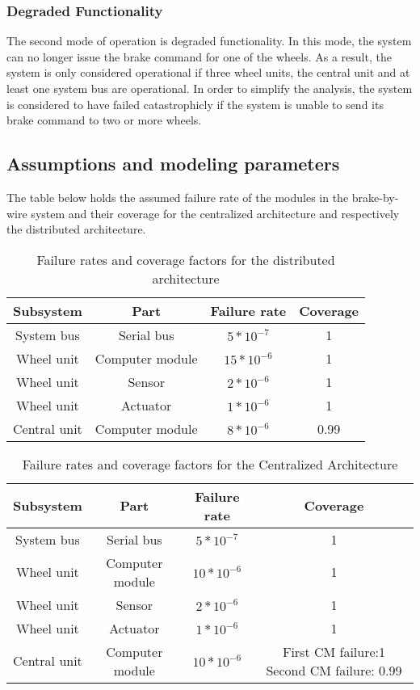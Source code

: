 \subsubsection{Degraded Functionality}
The second mode of operation is degraded functionality. In this mode, the system can no longer issue the brake command for one of the wheels. As a result, the system is only considered operational if three wheel units, the central unit and at least one system bus are operational. In order to simplify the analysis, the system is considered to have failed catastrophicly
if the system is unable to send its brake command to two or more wheels.
\subsection{Assumptions and modeling parameters}
The table below holds the assumed failure rate of the modules in the brake-by-wire system and their coverage for the centralized architecture and respectively the distributed architecture.  
\begin{table}[h]
\centering
\begin{tabular}{| c | c | c | c |}
\hline 
Subsystem & Part & Failure rate & Coverage\\
\hline
System bus & Serial bus& $5*10^{-7}$ & 1\\
\hline
Wheel unit & Computer module & $15*10^{-6}$ & 1\\
\hline
Wheel unit & Sensor & $2*10^{-6}$ & 1\\
\hline
Wheel unit & Actuator & $1*10^{-6}$ & 1\\
\hline
Central unit & Computer module & $8*10^{-6}$ & 0.99\\
\hline
\end{tabular}
\caption{Failure rates and coverage factors for the distributed architecture}
\label{tab:Put a Lable}
\end{table}
\begin{table}[h]
\centering
\begin{tabular}{| c | c | c | c |}
\hline 
Subsystem & Part & Failure rate & Coverage\\
\hline
System bus & Serial bus& $5*10^{-7}$ & 1\\
\hline
Wheel unit & Computer module & $10*10^{-6}$ & 1\\
\hline
Wheel unit & Sensor & $2*10^{-6}$ & 1\\
\hline
Wheel unit & Actuator & $1*10^{-6}$ & 1\\
\hline
Central unit & Computer module & $10*10^{-6}$ & First CM failure:1 Second CM failure: 0.99\\
\hline
\end{tabular}
\caption{Failure rates and coverage factors for the Centralized Architecture}
\label{tab:Put a Lable}
\end{table}
